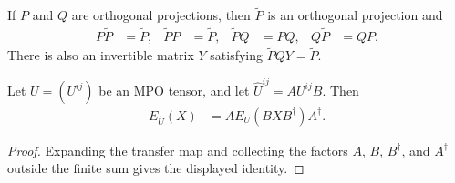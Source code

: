 \begin{lemma}
    \label{thm:mpu_matrix_reduced_projection}
    \leanok
    If $P$ and $Q$ are orthogonal projections, then $\widetilde P$ is an
    orthogonal projection and
    \begin{align}
        P\widetilde P  & =\widetilde P, &
        \widetilde P P & =\widetilde P, &
        \widetilde P Q & =PQ,           &
        Q\widetilde P  & =QP.
        \label{eq:mpu_reduced_projection_coordinate_identities}
    \end{align}
    There is also an invertible matrix $Y$ satisfying
    $\widetilde P QY=\widetilde P$.
\end{lemma}

\begin{lemma}
    \label{lem:mpu_transfer_map_virtual_sandwich}
    \leanok
    Let $U=(U^{ij})$ be an MPO tensor, and let
    $\widehat U^{ij}=AU^{ij}B$. Then
    \begin{align}
        E_{\widehat U}(X) & =A E_U(BXB^\dagger)A^\dagger.
    \end{align}
\end{lemma}

\begin{proof}\leanok
    Expanding the transfer map and collecting the factors $A$, $B$, $B^\dagger$, and
    $A^\dagger$ outside the finite sum gives the displayed identity.
\end{proof}

